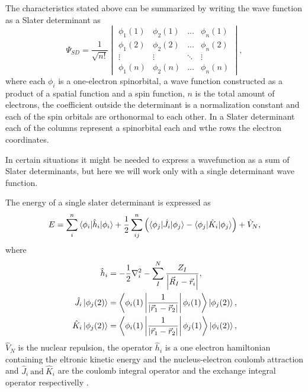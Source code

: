 \documentclass[../master_thesis.tex]{subfiles}
\begin{document}
The characteristics stated above can be summarized by writing the wave function as
a Slater determinant as \cite{Cramer:2004, Jensen:1999}
\begin{equation}
  \Psi_{SD} = \frac{1}{\sqrt{n!}}
  \begin{vmatrix}
    \phi_1(1) & \phi_2(1) & \ldots & \phi_n(1)\\
    \phi_1(2) & \phi_2(2) & \ldots & \phi_n(2)\\
    \vdots & \vdots & \ddots & \vdots \\
    \phi_1(n) & \phi_2(n) & \ldots & \phi_n(n)
  \end{vmatrix},
\end{equation}
where each $\phi_i$ is a one-electron spinorbital, a wave function constructed as
a product of a spatial function and a spin function\cite{Jensen:1999}, $n$ is the total amount of
electrons, the coefficient outside the determinant is a normalization constant
and each of the spin orbitals are orthonormal to each other. In a Slater determinant
each of the columns represent a spinorbital each and wthe rows the electron coordinates.

In certain situations it might be needed to express a wavefunction as a sum of Slater
determinants, but here we will work only with a single determinant wave function.

The energy of a single slater determinant is expressed as
\begin{equation}
  E = \sumdef[n]{i} \braket{\phi_i|\hat{h}_i|\phi_i} + \frac{1}{2} \sumdef[n]{ij}\left(\braket{\phi_j|\hat{J}_{i}|\phi_j} - \braket{\phi_j|\hat{K}_{i}|\phi_j}\right) + \hat{V}_{N}\text{,}
\end{equation}
where
\begin{align}
\hat{h}_i &= -\frac{1}{2}\nabla^2_i - \sumdef[N]{I}\frac{Z_I}{\abs{\Rvec_I - \rvec_i}},\\
\hat{J}_{i}\ket{\phi_j(2)} &= \left\langle\phi_i(1)\left|\frac{1}{\abs{\rvec_1 - \rvec_2}}\right|\phi_i(1)\right\rangle \ket{\phi_j(2)},\\
\hat{K}_{i}\ket{\phi_j(2)} &= \left\langle\phi_i(1)\left|\frac{1}{\abs{\rvec_1 - \rvec_2}}\right|\phi_j(1)\right\rangle\ket{\phi_i(2)},
\end{align}
$\hat{V}_N$ is the nuclear repulsion, the operator $\hat{h}_i$ is a one electron hamiltonian
containing the eltronic kinetic energy and the nucleus-electron coulomb attraction and
 $\hat{J}_i\ \text{and}\ \hat{K}_i$ are the coulomb integral operator and the exchange integral operator
 respectivelly \cite{Jensen:1999, Cramer:2004}.
\end{document}
